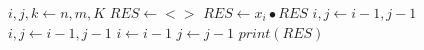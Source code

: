 \begin{algorithm}
    \begin{algorithmic}
            \State $i,j,k \gets n, m, K$
            \State $RES \gets <>$
                    \State $RES \gets x_i \bullet RES$
                    \State $i,j \gets i - 1, j - 1$
                    \State $i,j \gets i - 1, j - 1$
                    \State $i \gets i - 1$
                    \State $j \gets j - 1$
                \EndIf
            \EndWhile
            \State $print(RES)$
        \EndProcedure
    \end{algorithmic}
\end{algorithm}
